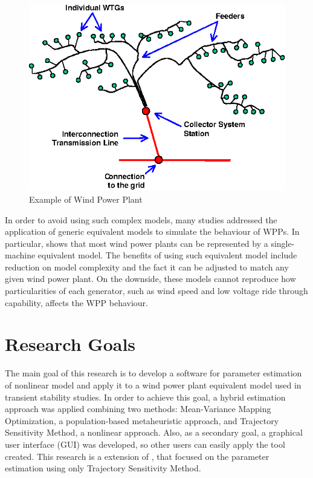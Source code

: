 \begin{figure}[h]
	\caption{Example of Wind Power Plant}
	\begin{center}
		\includegraphics[scale=1.25]{Images/WPP.eps}
	\end{center}
	\label{fig: WPP}
\end{figure}

In order to avoid using such complex models, many studies addressed the application of generic equivalent models to simulate the behaviour of WPPs. In particular, \cite{Ellis2011} shows that most wind power plants can be represented by a single-machine equivalent model. The benefits of using such equivalent model include reduction on model complexity and the fact it can be adjusted to match any given wind power plant. On the downside, these models cannot reproduce how particularities of each generator, such as wind speed and low voltage ride through capability, affects the WPP behaviour.

\section{Research Goals}

The main goal of this research is to develop a software for parameter estimation of nonlinear model and apply it to a wind power plant equivalent model used in transient stability studies. In order to achieve this goal, a hybrid estimation approach was applied combining two methods: Mean-Variance Mapping Optimization, a population-based metaheuristic approach, and Trajectory Sensitivity Method, a nonlinear approach. Also, as a secondary goal, a graphical user interface (GUI) was developed, so other users can easily apply the tool created. This research is a extension of \cite{Cari2015}, that focused on the parameter estimation using only Trajectory Sensitivity Method.

